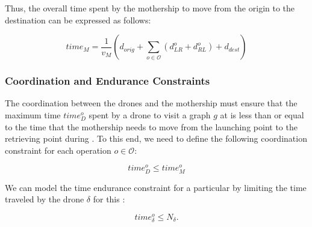 \noindent
Thus, the overall time spent by the mothership to move from the origin to the destination can be expressed as follows:

\begin{equation}
time_M = \frac{1}{v_M} (d_{orig} + \sum_{o \in \mathcal O} (d_{LR}^o + d_{RL}^o) + d_{dest})%
\label{eq:NOtimeM}
\end{equation}


\subsubsection*{Coordination and Endurance Constraints}
\noindent
The coordination between the drones and the mothership must ensure that the maximum time $time_D^o$ spent by a drone to visit a graph $g$ at  is less than or equal to the time that the mothership needs to move from the launching point to the retrieving point during . To this end, we need to define the following coordination constraint for each operation $o\in \mathcal O$:

\begin{equation}\tag{DCW-CO}\label{NODCW}
time_D^o \leq time_M^o
\end{equation}



\noindent
We can model the time endurance constraint for a particular  by limiting the time traveled by the drone $\delta$ for this :

\begin{equation}\tag{Endurance-CO}\label{NOCAP}
    time_\delta^o \leq N_\delta.
\end{equation}






